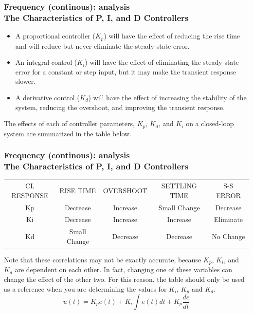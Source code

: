 \documentclass[hyperref={pdfpagelabels=true}]{beamer}
\begin{document}
\begin{frame}
\frametitle{Frequency (continous): analysis \\ {\large The Characteristics of P, I, and D Controllers}}
\begin{itemize}
\item A proportional controller ($K_p$) will have the effect of reducing the rise time and will reduce but never eliminate the steady-state error.
\item An integral control ($K_i$) will have the effect of eliminating the steady-state error for a constant or step input, but it may make the transient response slower.
\item A derivative control ($K_d$) will have the effect of increasing the stability of the system, reducing the overshoot, and improving the transient response.
\end{itemize}
The effects of each of controller parameters, $K_p$, $K_d$, and $K_i$ on a closed-loop system are summarized in the table below.
\end{frame}

\begin{frame}
\frametitle{Frequency (continous): analysis \\ {\large The Characteristics of P, I, and D Controllers}}
\tiny{
  \begin{tabular}{ c c c c c}
   CL RESPONSE &RISE TIME &OVERSHOOT &SETTLING TIME &S-S ERROR \\
   Kp &Decrease &Increase &Small Change &Decrease \\
   Ki &Decrease &Increase &Increase &Eliminate \\
  Kd &Small Change &Decrease &Decrease &No Change \\
  \end{tabular}
}
\newline \newline
Note that these correlations may not be exactly accurate, because $K_p$, $K_i$, and $K_d$ are dependent on each other. In fact, changing one of these variables can change the effect of the other two. For this reason, the table should only be used as a reference when you are determining the values for $K_i$, $K_p$ and $K_d$.
$$u(t)=K_pe(t)+K_i\int e(t)dt+K_p\frac{de}{dt}$$
\end{frame}
\end{document}
